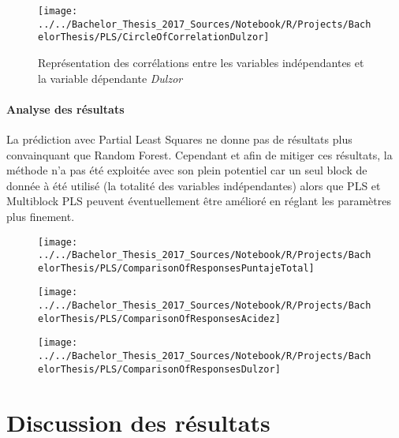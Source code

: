 \begin{figure}[H]
	\centering
	\texttt{[image: ../../Bachelor\_Thesis\_2017\_Sources/Notebook/R/Projects/BachelorThesis/PLS/CircleOfCorrelationDulzor]}
	\caption{Représentation des corrélations entre les variables indépendantes et la variable dépendante \textit{Dulzor}}
	\label{fig:circleofcorrelationdulzor}
\end{figure}


\subsubsection{Analyse des résultats}

La prédiction avec Partial Least Squares ne donne pas de résultats plus convainquant que Random Forest. Cependant et afin de mitiger ces résultats, la méthode n'a pas été exploitée avec son plein potentiel car un seul block de donnée à été utilisé (la totalité des variables indépendantes) alors que PLS et Multiblock PLS peuvent éventuellement être amélioré en réglant les paramètres plus finement. 

\begin{figure}[H]
	\centering
	\texttt{[image: ../../Bachelor\_Thesis\_2017\_Sources/Notebook/R/Projects/BachelorThesis/PLS/ComparisonOfResponsesPuntajeTotal]}
	\caption{}
	\label{fig:comparisonofresponsespuntajetotal}
\end{figure}


\begin{figure}[H]
	\centering
	\texttt{[image: ../../Bachelor\_Thesis\_2017\_Sources/Notebook/R/Projects/BachelorThesis/PLS/ComparisonOfResponsesAcidez]}
	\caption{}
	\label{fig:comparisonofresponsesacidez}
\end{figure}



\begin{figure}[H]
	\centering
	\texttt{[image: ../../Bachelor\_Thesis\_2017\_Sources/Notebook/R/Projects/BachelorThesis/PLS/ComparisonOfResponsesDulzor]}
	\caption{}
	\label{fig:comparisonofresponsesdulzor}
\end{figure}








\chapter{Discussion des résultats}







